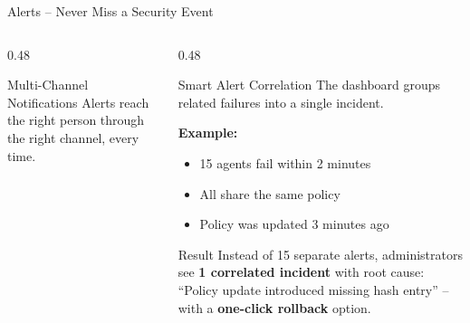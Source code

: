 \begin{frame}{Alerts -- Never Miss a Security Event}
  \begin{columns}[T]
    \begin{column}{0.48\textwidth}
      \begin{block}{Multi-Channel Notifications}
        \scriptsize
        Alerts reach the right person through the right channel, every time.
      \end{block}

      \vspace{0.1cm}

      \begin{center}
      \end{center}
    \end{column}
    \begin{column}{0.48\textwidth}
      \begin{block}{Smart Alert Correlation}
        \scriptsize
        The dashboard groups related failures into a single incident.
      \end{block}

      \vspace{0.1cm}
      \scriptsize

      \textbf{Example:}
      \begin{itemize}
        \item 15 agents fail within 2 minutes
        \item All share the same policy
        \item Policy was updated 3 minutes ago
      \end{itemize}

      \vspace{0.1cm}

      \begin{exampleblock}{\scriptsize Result}
        \tiny
        Instead of 15 separate alerts, administrators see \textbf{1 correlated incident}
        with root cause: ``Policy update introduced missing hash entry'' --
        with a \textbf{one-click rollback} option.
      \end{exampleblock}
    \end{column}
  \end{columns}


\end{frame}
